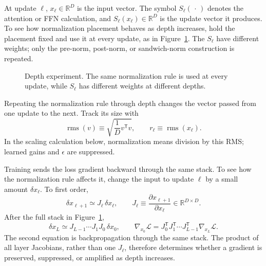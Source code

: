 \documentclass[11pt]{article}
\newcommand{\R}{\mathbb{R}}
\begin{document}
At update $\ell$, $x_\ell\in\R^D$ is the input vector.  The symbol
$S_\ell(\,\cdot\,)$ denotes the attention or FFN calculation, and
$S_\ell(x_\ell)\in\R^D$ is the update vector it produces.  To see how
normalization placement behaves as depth increases, hold the placement fixed
and use it at every update, as in Figure~\ref{fig:norm-depth-stack}.  The
$S_\ell$ have different weights; only the pre-norm, post-norm, or sandwich-norm
construction is repeated.

\begin{figure}[H]
  \centering
  \caption{Depth experiment.  The same normalization rule is used at every
  update, while $S_\ell$ has different weights at different depths.}
  \label{fig:norm-depth-stack}
\end{figure}

Repeating the normalization rule through depth changes the vector passed from
one update to the next.  Track its size with
\[
  \operatorname{rms}(v)
  \equiv\sqrt{\frac{1}{D}v^{\mathsf T}v},
  \qquad
  r_\ell\equiv\operatorname{rms}(x_\ell).
\]
In the scaling calculation below, normalization means division by this RMS;
learned gains and $\epsilon$ are suppressed.

Training sends the loss gradient backward through the same stack.  To see how
the normalization rule affects it, change the input to update $\ell$ by a
small amount $\delta x_\ell$.  To first order,
\[
  \delta x_{\ell+1}\simeq J_\ell\,\delta x_\ell,
  \qquad
  J_\ell\equiv\frac{\partial x_{\ell+1}}{\partial x_\ell}
  \in\R^{D\times D}.
\]
After the full stack in Figure~\ref{fig:norm-depth-stack},
\[
  \delta x_L
  \simeq J_{L-1}\cdots J_1J_0\,\delta x_0,
  \qquad
  \nabla_{x_0}\mathcal{L}
  =J_0^{\mathsf T}J_1^{\mathsf T}\cdots J_{L-1}^{\mathsf T}
   \nabla_{x_L}\mathcal{L}.
\]
The second equation is backpropagation through the same stack.  The product of
all layer Jacobians, rather than one $J_\ell$, therefore determines whether a
gradient is preserved, suppressed, or amplified as depth increases.
\end{document}
